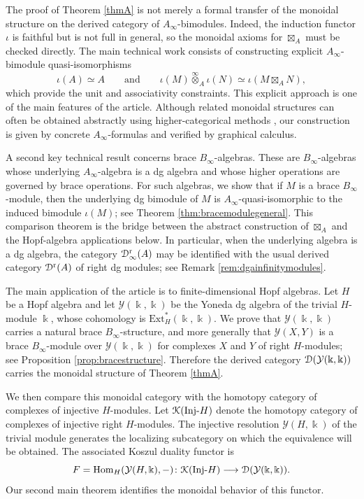 \documentclass[a4paper, 11pt]{amsart}
\theoremstyle{definition}
\theoremstyle{remark}
\numberwithin{equation}{section}
\newcommand{\Ext}{\mathrm{Ext}}
\newcommand{\Y}{\mathcal{Y}}
\newcommand{\RR}{\mathrm{r}}
\newcommand{\Hom}{\mathrm{Hom}}
\newcommand{\ED}{\EuScript{D}}
\newcommand{\EK}{\EuScript{K}}
\begin{document}
The proof of Theorem \ref{thmA} is not merely a formal transfer of the monoidal structure on the derived category of $A_\infty$-bimodules. Indeed, the induction functor $\iota$ is faithful but is not full in general, so the monoidal axioms for $\boxtimes_A$ must be checked directly. The main technical work consists of constructing explicit $A_\infty$-bimodule quasi-isomorphisms
\[
\iota(A)\simeq A
\qquad\text{and}\qquad
\iota(M)\overset{\infty}{\otimes}_A\iota(N)\simeq \iota(M\boxtimes_A N),
\]
which provide the unit and associativity constraints. This explicit approach is one of the main features of the article. Although related monoidal structures can often be obtained abstractly using higher-categorical methods \cite{Lu}, our construction is given by concrete $A_\infty$-formulas and verified by graphical calculus.

A second key technical result concerns brace $B_\infty$-algebras. These are $B_\infty$-algebras whose underlying $A_\infty$-algebra is a dg algebra and whose higher operations are governed by brace operations. For such algebras, we show that if $M$ is a brace $B_\infty$-module, then the underlying dg bimodule of $M$ is $A_\infty$-quasi-isomorphic to the induced bimodule $\iota(M)$; see Theorem \ref{thm:bracemodulegeneral}. This comparison theorem is the bridge between the abstract construction of $\boxtimes_A$ and the Hopf-algebra applications below. In particular, when the underlying algebra is a dg algebra, the category $\ED^{\RR}_\infty(A)$ may be identified with the usual derived category $\ED^{\RR}(A)$ of right dg modules; see Remark \ref{rem:dgainfinitymodules}.

The main application of the article is to finite-dimensional Hopf algebras. Let $H$ be a Hopf algebra and let $\Y(\Bbbk,\Bbbk)$ be the Yoneda dg algebra of the trivial $H$-module $\Bbbk$, whose cohomology is $\Ext_H^*(\Bbbk,\Bbbk)$. We prove that $\Y(\Bbbk,\Bbbk)$ carries a natural brace $B_\infty$-structure, and more generally that $\Y(X,Y)$ is a brace $B_\infty$-module over $\Y(\Bbbk,\Bbbk)$ for complexes $X$ and $Y$ of right $H$-modules; see Proposition \ref{prop:bracestructure}. Therefore the derived category $\ED(\Y(\Bbbk,\Bbbk))$ carries the monoidal structure of Theorem \ref{thmA}.

We then compare this monoidal category with the homotopy category of complexes of injective $H$-modules. Let $\EK(\mathrm{Inj}\text{-}H)$ denote the homotopy category of complexes of injective right $H$-modules. The injective resolution $\Y(H,\Bbbk)$ of the trivial module generates the localizing subcategory on which the equivalence will be obtained. The associated Koszul duality functor is
\[
F=\Hom_H(\Y(H,\Bbbk),-)
 \colon \EK(\mathrm{Inj}\text{-}H)\longrightarrow \ED(\Y(\Bbbk,\Bbbk)).
\]
Our second main theorem identifies the monoidal behavior of this functor.
\end{document}
